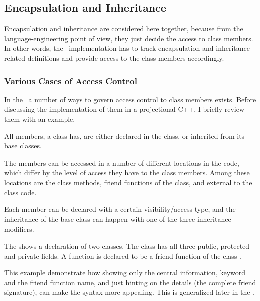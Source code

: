 \subsection{Encapsulation and Inheritance}


Encapsulation and inheritance are considered here together, because from the language-engineering point of view, 
they just decide the access to class members. In other words, the \pcpp\ implementation has to track
encapsulation and inheritance related definitions and provide access to the class members accordingly.


\subsubsection{Various Cases of Access Control}
\label{accessandfriends}

In the \cpppl\ a number of ways to govern access control to class members exists. Before discussing 
the implementation of them in a projectional C++, I briefly review them with an example.

All members, a class has, are either declared in the class, or inherited from its base classes. 

The members can be accessed in a number of different locations in the code, which differ by the level of access they have
to the class members. Among these locations are the class methods, friend functions of the class, and
external to the class code. 

Each member can be declared with a certain visibility/access type, and the inheritance
of the base class can happen with one of the three inheritance modifiers. 



The  shows a declaration of two classes. The class  has all three
public, protected and private fields. A function  is declared to be a
friend function of  the class . 

This example demonstrate how showing only the central information,  keyword and the
friend function name, and just hinting on the details (the complete friend signature), can make 
the syntax more appealing. This is generalized later in the .

